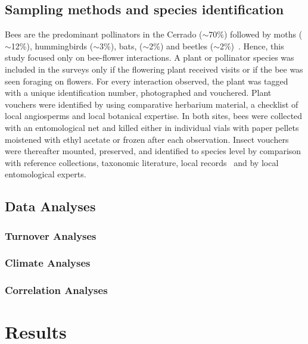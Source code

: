 \documentclass[11pt]{article}
\begin{document}
\subsection{Sampling methods and species identification}
Bees are the predominant pollinators in the Cerrado ($\sim$70\%) followed by moths ($\sim$12\%), hummingbirds ($\sim$3\%), bats, ($\sim$2\%) and beetles ($\sim$2\%)~\citep{Oliveira2002, Gottsberger2006a, Cappellari2011}. Hence, this study focused only on bee-flower interactions. A plant or pollinator species was included in the surveys only if the flowering plant received visits or if the bee was seen foraging on flowers. For every interaction observed, the plant was tagged with a unique identification number, photographed and vouchered. Plant vouchers were identified by using comparative herbarium material, a checklist of local angiosperms and local botanical expertise.  In both sites, bees were collected with an entomological net and killed either in individual vials with paper pellets moistened with ethyl acetate or frozen after each observation. Insect vouchers were thereafter mounted, preserved, and identified to species level by comparison with reference collections, taxonomic literature, local records~\citep{Moure1962, Silveira2002, Moure2007} and by local entomological experts. 




\subsection{Data Analyses}

\subsubsection{Turnover Analyses}
\subsubsection{Climate Analyses}
\subsubsection{Correlation Analyses}

\newpage
\section{Results} 
\end{document}
